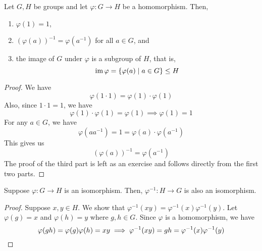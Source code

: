 \begin{prop} \label{prop:homo-basics}
    Let $G,H$ be groups and let $\varphi \colon G \to H$ be a homomorphism. Then, 
    \begin{enumerate}
        \item $\varphi(1) = 1$,
        \item $(\varphi(a))^{-1} = \varphi(a^{-1})$ for all $a \in G$, and
        \item the image of $G$ under $\varphi$ is a subgroup of $H$, that is,
        \[
            \operatorname{im}\varphi = \left\{ \varphi(a) \mid a \in G \right\} \leq H
        \]
    \end{enumerate}
\end{prop}
\begin{proof}
    We have
    \[
        \varphi(1 \cdot 1) = \varphi(1)\cdot \varphi(1)
    \]
    Also, since $1 \cdot 1 = 1$, we have
    \[
        \varphi(1)\cdot\varphi(1) = \varphi(1) \implies \varphi(1) = 1
    \]
    For any $a \in G$, we have
    \[
        \varphi(aa^{-1}) = 1 = \varphi(a)\cdot \varphi(a^{-1})
    \]
    This gives us
    \[
        (\varphi(a))^{-1} = \varphi(a^{-1})
    \]
    The proof of the third part is left as an exercise and follows directly from the first two parts.
\end{proof}

\begin{prop} \label{prop:inverse-iso}
    Suppose $\varphi \colon G \to H$ is an isomorphism. Then, $\varphi^{-1} \colon H \to G$ is also an isomorphism.
\end{prop}
\begin{proof}
    Suppose $x,y \in H$. We show that $\varphi^{-1}(xy) = \varphi^{-1}(x)\varphi^{-1}(y)$. Let $\varphi(g) = x$ and $\varphi(h) = y$ where $g,h \in G$. Since $\varphi$ is a homomorphism, we have
    \[
        \varphi(gh) = \varphi(g)\varphi(h) = xy \implies \varphi^{-1}(xy) = gh = \varphi^{-1}(x)\varphi^{-1}(y) \qedhere
    \]  
\end{proof}

